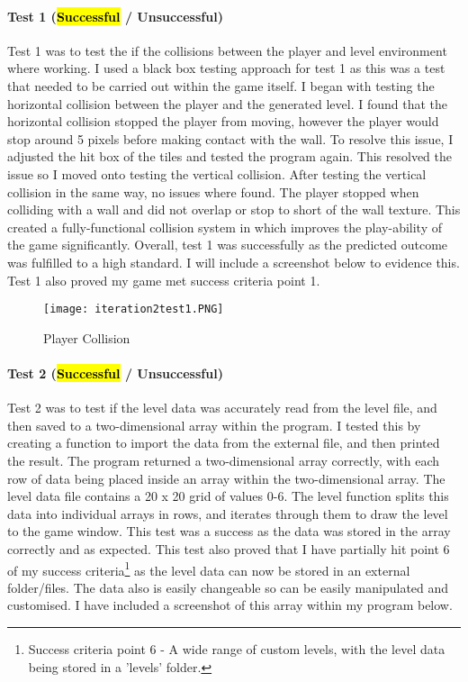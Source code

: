 \documentclass[12pt]{report}
\begin{document}
\paragraph{Test 1 (\hl{Successful} / Unsuccessful)}
Test 1 was to test the if the collisions between the player and level environment where working. I used a black box testing approach for test 1 as this was a test that needed to be carried out within the game itself. I began with testing the horizontal collision between the player and the generated level. I found that the horizontal collision stopped the player from moving, however the player would stop around 5 pixels before making contact with the wall. To resolve this issue, I adjusted the hit box of the tiles and tested the program again. This resolved the issue so I moved onto testing the vertical collision. After testing the vertical collision in the same way, no issues where found. The player stopped when colliding with a wall and did not overlap or stop to short of the wall texture. This created a fully-functional collision system in which improves the play-ability of the game significantly. Overall, test 1 was successfully as the predicted outcome was fulfilled to a high standard. I will include a screenshot below to evidence this. Test 1 also proved my game met success criteria point 1.

\pagebreak 

\begin{figure}[H]
    \centering
    \texttt{[image: iteration2test1.PNG]}
    \caption{Player Collision}
\end{figure}

\paragraph{Test 2 (\hl{Successful} / Unsuccessful)}
Test 2 was to test if the level data was accurately read from the level file, and then saved to a two-dimensional array within the program. I tested this by creating a function to import the data from the external file, and then printed the result. The program returned a two-dimensional array correctly, with each row of data being placed inside an array within the two-dimensional array. The level data file contains a 20 x 20 grid of values 0-6. The level function splits this data into individual arrays in rows, and iterates through them to draw the level to the game window. This test was a success as the data was stored in the array correctly and as expected. This test also proved that I have partially hit point 6 of my success criteria\footnote{Success criteria point 6 - A wide range of custom levels, with the level data being stored in a 'levels' folder.} as the level data can now be stored in an external folder/files. The data also is easily changeable so can be easily manipulated and customised. I have included a screenshot of this array within my program below.  
\end{document}
